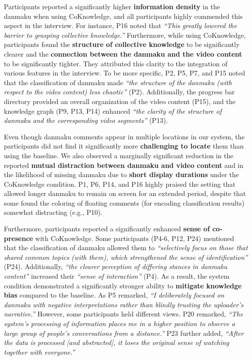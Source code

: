 Participants reported a significantly higher \textbf{information density} in the danmaku when using CoKnowledge, and all participants highly commended this aspect in the interview. For instance, P16 noted that \textit{``This greatly lowered the barrier to grasping collective knowledge.''} Furthermore, while using CoKnowledge, participants found the \textbf{structure of collective knowledge} to be significantly clearer and the \textbf{connection between the danmaku and the video content} to be significantly tighter. They attributed this clarity to the integration of various features in the interview. To be more specific, P2, P5, P7, and P15 noted that the classification of danmaku made \textit{``the structure of the danmaku (with respect to the video content) less chaotic''} (P2). Additionally, the progress bar directory provided an overall organization of the video content (P15), and the knowledge graph (P9, P13, P14) enhanced \textit{``the clarity of the structure of danmaku and the corresponding video segments''} (P13).

Even though danmaku comments appear in multiple locations in our system, the participants did not find it significantly more \textbf{challenging to locate} them than using the baseline.
We also observed a marginally significant reduction in the reported \textbf{mutual distraction between danmaku and video content} and in the likelihood of missing danmaku due to \textbf{short display durations} under the CoKnowledge condition. P1, P6, P14, and P16 highly praised the setting that allowed longer danmaku to remain on screen for an extended period, despite that some found the coloring of floating comments (for encoding classification results) somewhat distracting (e.g., P10). 

Furthermore, participants reported a significantly enhanced \textbf{sense of co-presence} with CoKnowledge. Some participants (P4-6, P12, P24) mentioned that the classification of danmaku allowed them to \textit{``selectively focus on those that shared common topics (with them), which strengthened the sense of identification''} (P24).  Additionally, \textit{``the clearer perception of differing stances in danmaku content''} increased their \textit{``sense of interaction''} (P4). As a result, the system condition demonstrated a significantly stronger ability to \textbf{mitigate knowledge bias} compared to the baseline. As P5 remarked, \textit{``I deliberately focused on danmaku with negative interpretations rather than blindly trusting the uploader’s narrative.''} 
However, some participants held different views. P20 remarked, \textit{``The system's processing of information places me in a higher position to observe a large group of people’s conversations from a distance.''} %
P23 further added, \textit{``After the data is processed [and abstracted], it loses the original sense of watching together with everyone.''}


